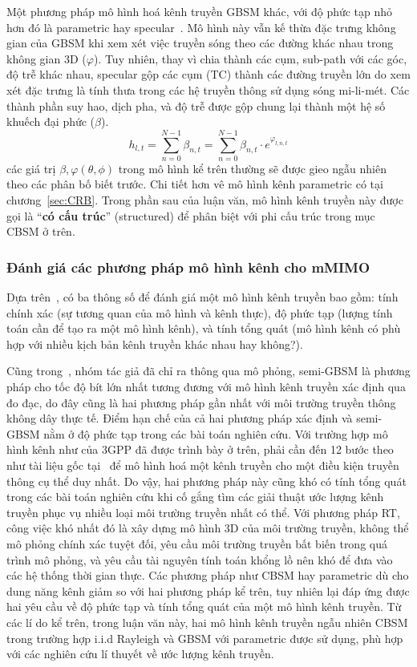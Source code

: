 Một phương pháp mô hình hoá kênh truyền GBSM khác, với độ phức tạp nhỏ hơn đó là parametric hay specular~\cite{Le2018, Swindlehurst2022}. Mô hình này vẫn kế thừa đặc trưng không gian của GBSM khi xem xét việc truyền sóng theo các đường khác nhau trong không gian 3D ($\varphi$). Tuy nhiên, thay vì chia thành các cụm, sub-path với các góc, độ trễ khác nhau, specular gộp các cụm (TC) thành các đường truyền lớn do xem xét đặc trưng là tính thưa trong các hệ truyền thông sử dụng sóng mi-li-mét. Các thành phần suy hao, dịch pha, và độ trễ được gộp chung lại thành một hệ số khuếch đại phức ($\beta$).
\begin{equation}
    h_{l, t} = \sum\limits_{n=0}^{N-1} \beta_{n, t} = \sum\limits_{n=0}^{N-1} \beta_{n, t} \cdot e^{\varphi_{l, n, t}} 
\end{equation}
các giá trị $\beta, \varphi(\theta, \phi)$ trong mô hình kể trên thường sẽ được gieo ngẫu nhiên theo các phân bố biết trước. Chi tiết hơn vê mô hình kênh parametric có tại chương~\ref{sec:CRB}. Trong phần sau của luận văn, mô hình kênh truyền này được gọi là ``\textbf{có cấu trúc}'' (structured) để phân biệt với phi cấu trúc trong mục CBSM ở trên.

\subsubsection{Đánh giá các phương pháp mô hình kênh cho mMIMO}

Dựa trên~\cite{Feng2022}, có ba thông số để đánh giá một mô hình kênh truyền bao gồm: tính chính xác (sự tương quan của mô hình và kênh thực), độ phức tạp (lượng tính toán cần để tạo ra một mô hình kênh), và tính tổng quát (mô hình kênh có phù hợp với nhiều kịch bản kênh truyền khác nhau hay không?).

Cũng trong~\cite{Feng2022}, nhóm tác giả đã chỉ ra thông qua mô phỏng, semi-GBSM là phương pháp cho tốc độ bít lớn nhất tương đương với mô hình kênh truyền xác định qua đo đạc, do đây cũng là hai phương pháp gần nhất với môi trường truyền thông không dây thực tế. Điểm hạn chế của cả hai phương pháp xác định và semi-GBSM nằm ở độ phức tạp trong các bài toán nghiên cứu. Với trường hợp mô hình kênh như của 3GPP đã được trình bày ở trên, phải cần đến 12 bước theo như tài liệu gốc tại~\cite{r16} để mô hình hoá một kênh truyền cho một điều kiện truyền thông cụ thể duy nhất. Do vậy, hai phương pháp này cũng khó có tính tổng quát trong các bài toán nghiên cứu khi cố gắng tìm các giải thuật ước lượng kênh truyền phục vụ nhiều loại môi trường truyền nhất có thể. Với phương pháp RT, công việc khó nhất đó là xây dựng mô hình 3D của môi trường truyền, không thể mô phỏng chính xác tuyệt đối, yêu cầu môi trường truyền bất biến trong quá trình mô phỏng, và yêu cầu tài nguyên tính toán khổng lồ nên khó để đưa vào các hệ thống thời gian thực. Các phương pháp như CBSM hay parametric dù cho dung năng kênh giảm so với hai phương pháp kể trên, tuy nhiên lại đáp ứng được hai yêu cầu về độ phức tạp và tính tổng quát của một mô hình kênh truyền. Từ các lí do kể trên, trong luận văn này, hai mô hình kênh truyền ngẫu nhiên CBSM trong trường hợp i.i.d Rayleigh và GBSM với parametric được sử dụng, phù hợp với các nghiên cứu lí thuyết về ước lượng kênh truyền.

